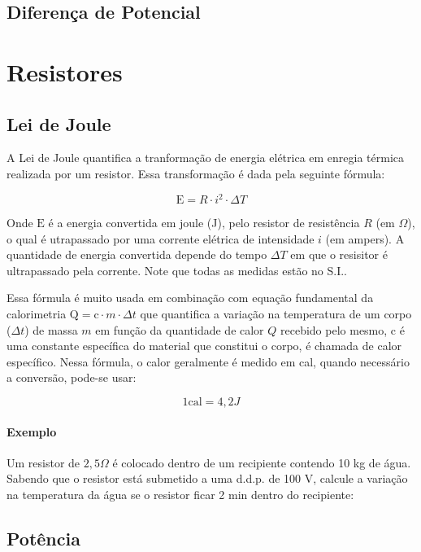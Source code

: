 \documentclass[12pt,a4paper]{book}
\begin{document}
		\subsection{Diferença de Potencial}

	\section{Resistores}
	
		\subsection{Lei de Joule}

A Lei de Joule quantifica a tranformação de energia elétrica em enregia térmica realizada por um resistor. Essa transformação é dada pela seguinte fórmula:

				$$\mathrm{E} = R \cdot i^2 \cdot \Delta T$$	

Onde $\mathrm{E}$ é a energia convertida em joule (J), pelo resistor de resistência $R$ (em $\Omega$), o qual é utrapassado por uma corrente elétrica de intensidade $i$ (em ampers). A quantidade de energia convertida depende do tempo $\Delta T$ em que o resisitor é ultrapassado pela corrente. Note que todas as medidas estão no S.I.. 

Essa fórmula é muito usada em combinação com equação fundamental da calorimetria $\mathrm{Q} = \mathrm{c} \cdot m \cdot \Delta t$ que quantifica a variação na temperatura de um corpo ($\Delta t$) de massa $m$ em função da quantidade de calor $Q$ recebido pelo mesmo, c é uma constante específica do material que constitui o corpo, é chamada de calor específico. Nessa fórmula, o calor geralmente é medido em cal, quando necessário a conversão, pode-se usar:

				$$ 1 \mathrm{cal} = 4,2 J$$

			\paragraph{Exemplo} Um resistor de $2,5 \Omega$ é colocado dentro de um recipiente contendo 10 kg de água. Sabendo que o resistor está submetido a uma d.d.p. de 100 V, calcule a variação na temperatura da água se o resistor ficar 2 min dentro do recipiente:
			
		\subsection{Potência}
\end{document}
